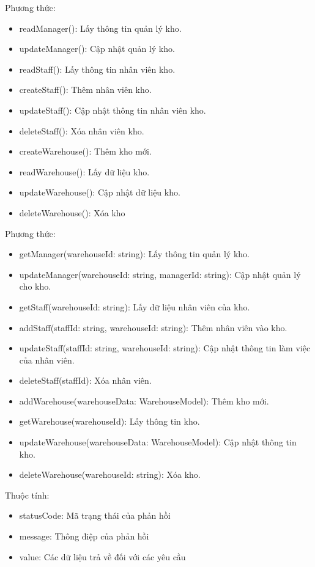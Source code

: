 Phương thức:
\begin{itemize}
	\item readManager(): Lấy thông tin quản lý kho.
	\item updateManager(): Cập nhật quản lý kho.
	\item readStaff(): Lấy thông tin nhân viên kho.
	\item createStaff(): Thêm nhân viên kho.
	\item updateStaff(): Cập nhật thông tin nhân viên kho.
	\item deleteStaff(): Xóa nhân viên kho.
	\item createWarehouse(): Thêm kho mới.
	\item readWarehouse(): Lấy dữ liệu kho.
	\item updateWarehouse(): Cập nhật dữ liệu kho.
	\item deleteWarehouse(): Xóa kho
\end{itemize}

Phương thức:
\begin{itemize}
	\item getManager(warehouseId: string): Lấy thông tin quản lý kho.
	\item updateManager(warehouseId: string, managerId: string): Cập nhật quản lý cho kho.
	\item getStaff(warehouseId: string): Lấy dữ liệu nhân viên của kho.
	\item addStaff(staffId: string, warehouseId: string): Thêm nhân viên vào kho.
	\item updateStaff(staffId: string, warehouseId: string): Cập nhật thông tin làm việc của nhân viên.
	\item deleteStaff(staffId): Xóa nhân viên.
	\item addWarehouse(warehouseData: WarehouseModel): Thêm kho mới.
	\item getWarehouse(warehouseId): Lấy thông tin kho.
	\item updateWarehouse(warehouseData: WarehouseModel): Cập nhật thông tin kho.
	\item deleteWarehouse(warehouseId: string): Xóa kho.
\end{itemize}

Thuộc tính:
\begin{itemize}
	\item statusCode: Mã trạng thái của phản hồi
	\item message: Thông điệp của phản hồi
	\item value: Các dữ liệu trả về đối với các yêu cầu
\end{itemize}


